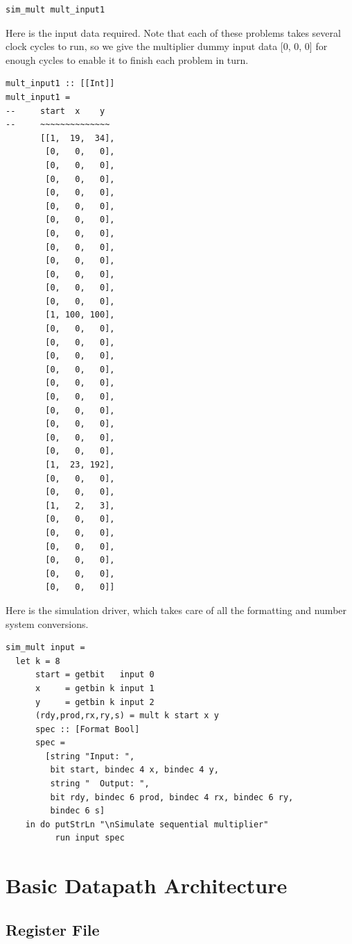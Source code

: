 \documentclass[a4paper,openany,fleqn]{book}
\begin{document}
\begin{verbatim}
sim_mult mult_input1
\end{verbatim}

Here is the input data required.  Note that each of these problems
takes several clock cycles to run, so we give the multiplier dummy
input data [0, 0, 0] for enough cycles to enable it to finish each
problem in turn.

\begin{verbatim}
mult_input1 :: [[Int]]
mult_input1 =
--     start  x    y
--     ~~~~~~~~~~~~~~
       [[1,  19,  34],
        [0,   0,   0],
        [0,   0,   0],
        [0,   0,   0],
        [0,   0,   0],
        [0,   0,   0],
        [0,   0,   0],
        [0,   0,   0],
        [0,   0,   0],
        [0,   0,   0],
        [0,   0,   0],
        [0,   0,   0],
        [0,   0,   0],
        [1, 100, 100],
        [0,   0,   0],
        [0,   0,   0],
        [0,   0,   0],
        [0,   0,   0],
        [0,   0,   0],
        [0,   0,   0],
        [0,   0,   0],
        [0,   0,   0],
        [0,   0,   0],
        [0,   0,   0],
        [1,  23, 192],
        [0,   0,   0],
        [0,   0,   0],
        [1,   2,   3],
        [0,   0,   0],
        [0,   0,   0],
        [0,   0,   0],
        [0,   0,   0],
        [0,   0,   0],
        [0,   0,   0]]
\end{verbatim}

Here is the simulation driver, which takes care of all the formatting
and number system conversions.

\begin{verbatim}
sim_mult input =
  let k = 8
      start = getbit   input 0
      x     = getbin k input 1
      y     = getbin k input 2
      (rdy,prod,rx,ry,s) = mult k start x y
      spec :: [Format Bool]
      spec =
        [string "Input: ",
         bit start, bindec 4 x, bindec 4 y,
         string "  Output: ",
         bit rdy, bindec 6 prod, bindec 4 rx, bindec 6 ry,
         bindec 6 s]
    in do putStrLn "\nSimulate sequential multiplier"
          run input spec
\end{verbatim}

\chapter{Basic Datapath Architecture}
\label{sec:asics-datapath-arch}




\section{Register File}
\label{sec:register-file}
\end{document}
